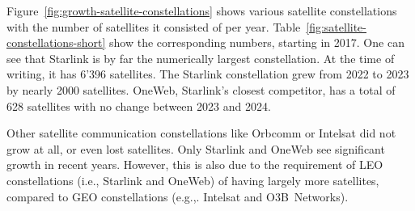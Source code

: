 Figure~\ref{fig:growth-satellite-constellations} shows various satellite
constellations with the number of satellites it consisted of per year.
Table~\ref{fig:satellite-constellations-short} show the corresponding numbers,
starting in 2017. One can see that Starlink is by far the numerically largest
constellation. At the time of writing, it has 6'396 satellites. The Starlink
constellation grew from 2022 to 2023 by nearly 2000 satellites. OneWeb,
Starlink's closest competitor, has a total of 628 satellites with no change
between 2023 and 2024.

Other satellite communication constellations like Orbcomm or Intelsat did not
grow at all, or even lost satellites. Only Starlink and OneWeb see significant
growth in recent years. However, this is also due to the requirement of LEO
constellations (i.e., Starlink and OneWeb) of having largely more satellites,
compared to GEO constellations (e.g.,. Intelsat and O3B~Networks).
